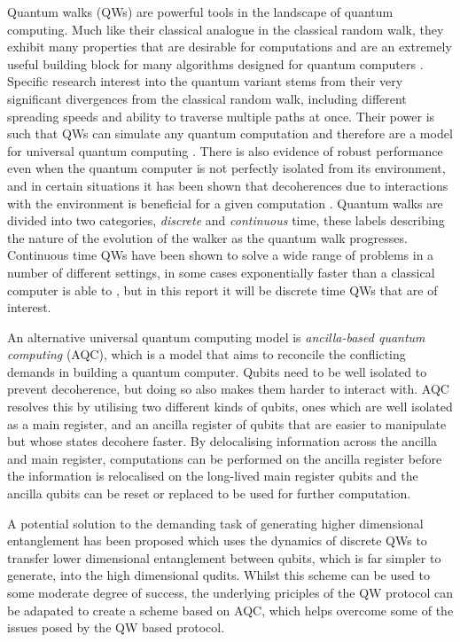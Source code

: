 Quantum walks (QWs) are powerful tools in the landscape of quantum computing. 
Much like their classical analogue in the classical random walk, they exhibit many properties that are desirable for computations and are an extremely useful building block for many algorithms designed for quantum computers \cite{shenvi2003}. 
Specific research interest into the quantum variant stems from their very significant divergences from the classical random walk, including different spreading speeds and ability to traverse multiple paths at once. 
Their power is such that QWs can simulate any quantum computation and therefore are a model for universal quantum computing \cite{Childs_2009}.
There is also evidence of robust performance even when the quantum computer is not perfectly isolated from its environment, and in certain situations it has been shown that decoherences due to interactions with the environment is beneficial for a given computation \cite{KENDON_2007}.
Quantum walks are divided into two categories, \emph{discrete} and \emph{continuous} time, these labels describing the nature of the evolution of the walker as the quantum walk progresses.
Continuous time QWs have been shown to solve a wide range of problems in a number of different settings, in some cases exponentially faster than a classical computer is able to \cite{Childs_2003}, but in this report it will be discrete time QWs that are of interest. 

An alternative universal quantum computing model is \emph{ancilla-based quantum computing} (AQC), which is a model that aims to reconcile the conflicting demands in building a quantum computer.
Qubits need to be well isolated to prevent decoherence, but doing so also makes them harder to interact with.
AQC resolves this by utilising two different kinds of qubits, ones which are well isolated as a main register, and an ancilla register of qubits that are easier to manipulate but whose states decohere faster.
By delocalising information across the ancilla and main register, computations can be performed on the ancilla register before the information is relocalised on the long-lived main register qubits and the ancilla qubits can be reset or replaced to be used for further computation.

A potential solution to the demanding task of generating higher dimensional entanglement has been proposed \cite{giordani2020} which uses the dynamics of discrete QWs to transfer lower dimensional entanglement between qubits, which is far simpler to generate, into the high dimensional qudits.
Whilst this scheme can be used to some moderate degree of success, the underlying priciples of the QW protocol can be adapated to create a scheme based on AQC, which helps overcome some of the issues posed by the QW based protocol.

